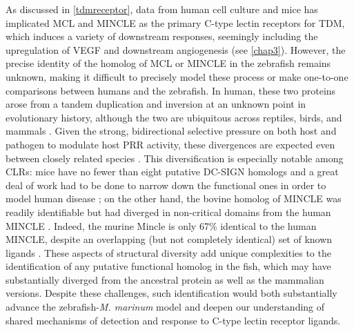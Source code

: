 As discussed in \autoref{tdmreceptor}, data from human cell culture and mice has implicated MCL and MINCLE as the primary C\hyp{}type lectin receptors for TDM, which induces a variety of downstream responses, seemingly including the upregulation of VEGF and downstream angiogenesis (see \autoref{chap3}). However, the precise identity of the homolog of MCL or MINCLE in the zebrafish remains unknown, making it difficult to precisely model these process or make one\hyp{}to\hyp{}one comparisons between humans and the zebrafish. In human, these two proteins arose from a tandem duplication and inversion at an unknown point in evolutionary history, although the two are ubiquitous across reptiles, birds, and mammals \citep{Miyake2013, Richardson2014}. Given the strong, bidirectional selective pressure on both host and pathogen to modulate host PRR activity, these divergences are expected even between closely related species \citep{Rambaruth2015}. This diversification is especially notable among CLRs: mice have no fewer than eight putative DC\hyp{}SIGN homologs and a great deal of work had to be done to narrow down the functional ones in order to model human disease \citep{GarciaVallejo2013}; on the other hand, the bovine homolog of MINCLE was readily identifiable but had diverged in non\hyp{}critical domains from the human MINCLE \citep{Feinberg2016, Furukawa2013, Feinberg2013}. Indeed, the murine Mincle is only 67\% identical to the human MINCLE, despite an overlapping (but not completely identical) set of known ligands \citep{Matsumoto1999}. These aspects of structural diversity add unique complexities to the identification of any putative functional homolog in the fish, which may have substantially diverged from the ancestral protein as well as the mammalian versions. Despite these challenges, such identification would both substantially advance the zebrafish\hyp{}\textit{M. marinum} model and deepen our understanding of shared mechanisms of detection and response to C\hyp{}type lectin receptor ligands.

